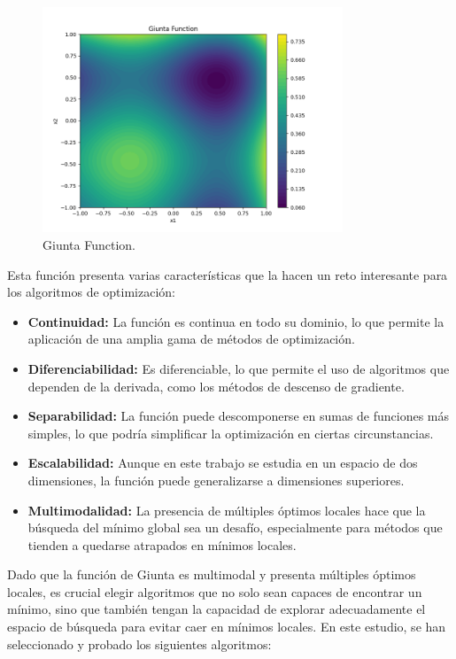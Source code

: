 \documentclass[fontsize=10pt]{article}
\begin{document}
\begin{figure}[h!]
    \centering
    \includegraphics[width=0.8\textwidth]{images/giunta_function.png}
    \caption{Giunta Function.}
    \label{fig:giunta_function}
\end{figure}

Esta función presenta varias características que la 
hacen un reto interesante para los algoritmos de 
optimización:

\begin{itemize}
    \item \textbf{Continuidad:} La función es continua 
    en todo su dominio, lo que permite la aplicación 
    de una amplia gama de métodos de optimización.
    \item \textbf{Diferenciabilidad:} Es diferenciable, 
    lo que permite el uso de algoritmos que dependen 
    de la derivada, como los métodos de descenso de 
    gradiente.
    \item \textbf{Separabilidad:} La función puede 
    descomponerse en sumas de funciones más simples, 
    lo que podría simplificar la optimización en 
    ciertas circunstancias.
    \item \textbf{Escalabilidad:} Aunque en este 
    trabajo se estudia en un espacio de dos dimensiones, 
    la función puede generalizarse a dimensiones 
    superiores.
    \item \textbf{Multimodalidad:} La presencia de 
    múltiples óptimos locales hace que la búsqueda 
    del mínimo global sea un desafío, especialmente 
    para métodos que tienden a quedarse atrapados en 
    mínimos locales.
\end{itemize}

Dado que la función de Giunta es multimodal y presenta 
múltiples óptimos locales, es crucial elegir 
algoritmos que no solo sean capaces de encontrar un 
mínimo, sino que también tengan la capacidad de 
explorar adecuadamente el espacio de búsqueda para 
evitar caer en mínimos locales. En este estudio, 
se han seleccionado y probado los siguientes algoritmos:
\end{document}
